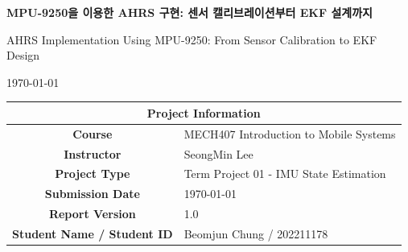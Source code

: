 \begin{titlepage}
  \begin{center}

    \vspace*{3cm}

    {\LARGE\bfseries
        MPU-9250을 이용한 AHRS 구현: 센서 캘리브레이션부터 EKF 설계까지
    }

    \vspace{1.2em}

    {\large
      AHRS Implementation Using MPU-9250: From Sensor Calibration to EKF Design
    }

    \vspace{3cm}

    {\large \today}

    \vfill
    
    \begin{table}[h]
      \centering
      \renewcommand{\arraystretch}{1.5} %
      \begin{tabular}{|c || l|}
        \hline \hline
        \multicolumn{2}{|c|}{\textbf{Project Information}} \\ \hline \hline
        \textbf{Course}       & MECH407 Introduction to Mobile Systems \\ \hline
        \textbf{Instructor}   & SeongMin Lee \\ \hline
        \textbf{Project Type}  & Term Project 01 - IMU State Estimation \\ \hline
        \textbf{Submission Date} & \today \\ \hline
        \textbf{Report Version} & 1.0 \\ \hline
        \textbf{Student Name / Student ID} & Beomjun Chung / 202211178 \\ \hline \hline
      \end{tabular}
    \end{table}
    
    \vspace{1cm} %

  \end{center}
\end{titlepage}